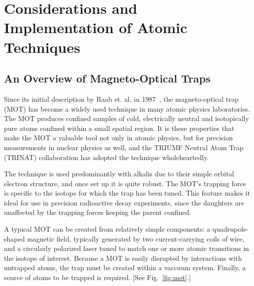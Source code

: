 %
%
%
\clearpage
\chapter{Considerations and Implementation of Atomic Techniques}
\label{atomicphysics_chapter}

\section{An Overview of Magneto-Optical Traps}
\label{section:mot}
Since its initial description by Raab et. al. in 1987~\cite{raabprentiss}, the magneto-optical trap (MOT) has become a widely used technique in many atomic physics laboratories.  The MOT produces confined samples of cold, electrically neutral and isotopically pure atoms confined within a small spatial region.  It is these properties that make the MOT a valuable tool not only in atomic physics, but for precision measurements in nuclear physics as well, and the TRIUMF Neutral Atom Trap (TRINAT) collaboration has adopted the technique wholeheartedly.

The technique is used predominantly with alkalis due to their simple orbital electron structure, and once set up it is quite robust.  The MOT's trapping force is specific to the isotope for which the trap has been tuned. This feature makes it ideal for use in precision radioactive decay experiments, since the daughters are unaffected by the trapping forces keeping the parent confined.

A typical MOT can be created from relatively simple components:  a quadrupole-shaped magnetic field, typically generated by two current-carrying coils of wire, and a circularly polarized laser tuned to match one or more atomic transitions in the isotope of interest.  Because a MOT is easily disrupted by interactions with untrapped atoms, the trap must be created within a vaccuum system.  Finally, a source of atoms to be trapped is required.  [See Fig.~\ref{fig:mot}.]

